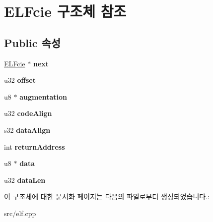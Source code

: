 \hypertarget{struct_e_l_fcie}{}\section{E\+L\+Fcie 구조체 참조}
\label{struct_e_l_fcie}
\subsection*{Public 속성}
\begin{DoxyCompactItemize}
\item 
\mbox{\label{struct_e_l_fcie_a478060c105cc829f5b800d20d05d4901}} 
\mbox{\hyperlink{struct_e_l_fcie}{E\+L\+Fcie}} $\ast$ {\bfseries next}
\item 
\mbox{\label{struct_e_l_fcie_ad77ede21a2619e2a994435f11df3cf53}} 
u32 {\bfseries offset}
\item 
\mbox{\label{struct_e_l_fcie_a181b83638e92b83dfc39c641ac71557b}} 
u8 $\ast$ {\bfseries augmentation}
\item 
\mbox{\label{struct_e_l_fcie_aec7907fb3c0c13aeba624a1dea3e14ca}} 
u32 {\bfseries code\+Align}
\item 
\mbox{\label{struct_e_l_fcie_af5d3149b3520f0d56dd96c6f0df8e60f}} 
s32 {\bfseries data\+Align}
\item 
\mbox{\label{struct_e_l_fcie_a5c87d6ce3906a0421f5815bda3520abf}} 
int {\bfseries return\+Address}
\item 
\mbox{\label{struct_e_l_fcie_a24ea835dfe2a5089b098aae27a6de0d8}} 
u8 $\ast$ {\bfseries data}
\item 
\mbox{\label{struct_e_l_fcie_a19efbc40471e1308ea700858a74aaa49}} 
u32 {\bfseries data\+Len}
\end{DoxyCompactItemize}


이 구조체에 대한 문서화 페이지는 다음의 파일로부터 생성되었습니다.\+:\begin{DoxyCompactItemize}
\item 
src/elf.\+cpp\end{DoxyCompactItemize}

